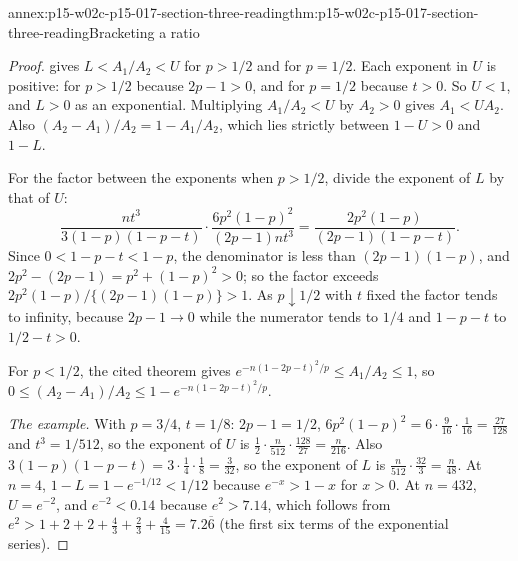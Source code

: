 \begin{annexitem}{annex:p15-w02c-p15-017-section-three-reading}{thm:p15-w02c-p15-017-section-three-reading}{Bracketing a ratio}
\begin{proof}
 gives \(L<A_1/A_2<U\) for
\(p>1/2\) and for \(p=1/2\). Each exponent in \(U\) is positive: for
\(p>1/2\) because \(2p-1>0\), and for \(p=1/2\) because \(t>0\). So
\(U<1\), and \(L>0\) as an exponential. Multiplying \(A_1/A_2<U\) by
\(A_2>0\) gives \(A_1<UA_2\). Also
\((A_2-A_1)/A_2=1-A_1/A_2\), which lies strictly between \(1-U>0\) and
\(1-L\).

For the factor between the exponents when \(p>1/2\), divide the exponent
of \(L\) by that of \(U\):
\[
 \frac{nt^3}{3(1-p)(1-p-t)}\cdot\frac{6p^2(1-p)^2}{(2p-1)nt^3}
 =\frac{2p^2(1-p)}{(2p-1)(1-p-t)} .
\]
Since \(0<1-p-t<1-p\), the denominator is less than \((2p-1)(1-p)\), and
\(2p^2-(2p-1)=p^2+(1-p)^2>0\); so the factor exceeds
\(2p^2(1-p)/\{(2p-1)(1-p)\}>1\). As \(p\downarrow1/2\) with \(t\) fixed
the factor tends to infinity, because \(2p-1\to0\) while the numerator
tends to \(1/4\) and \(1-p-t\) to \(1/2-t>0\).

For \(p<1/2\), the cited theorem gives
\(e^{-n(1-2p-t)^2/p}\leq A_1/A_2\leq1\), so
\(0\leq(A_2-A_1)/A_2\leq1-e^{-n(1-2p-t)^2/p}\).

\emph{The example.} With \(p=3/4\), \(t=1/8\): \(2p-1=1/2\),
\(6p^2(1-p)^2=6\cdot\tfrac9{16}\cdot\tfrac1{16}=\tfrac{27}{128}\) and
\(t^3=1/512\), so the exponent of \(U\) is
\(\tfrac12\cdot\tfrac n{512}\cdot\tfrac{128}{27}=\tfrac n{216}\). Also
\(3(1-p)(1-p-t)=3\cdot\tfrac14\cdot\tfrac18=\tfrac3{32}\), so the
exponent of \(L\) is \(\tfrac n{512}\cdot\tfrac{32}3=\tfrac n{48}\). At
\(n=4\), \(1-L=1-e^{-1/12}<1/12\) because \(e^{-x}>1-x\) for \(x>0\). At
\(n=432\), \(U=e^{-2}\), and \(e^{-2}<0.14\) because \(e^2>7.14\), which
follows from \(e^2>1+2+2+\tfrac43+\tfrac23+\tfrac4{15}=7.2\overline6\)
(the first six terms of the exponential series).
\end{proof}
\end{annexitem}

